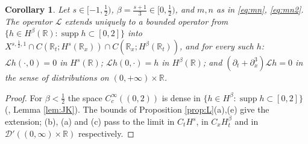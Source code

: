 \documentclass[10pt,reqno]{amsart}
\newtheorem{corollary}[theorem]{Corollary}
\theoremstyle{remark}
\numberwithin{equation}{section}
\newcommand{\R}{\mathbb R}
\newcommand{\pd}{\partial}
\newcommand{\supp}{\operatorname{supp}}
\newcommand{\Lc}{\mathcal{L}}
\begin{document}
\begin{corollary}\label{cor:Lext}
Let $s\in[-1,\frac12)$, $\beta=\frac{s+1}3\in[0,\frac12)$, and $m,n$ as in \eqref{eq:mn}, \eqref{eq:mn2}. The operator $\Lc$ extends uniquely to a bounded operator from $\{h\in H^\beta(\R):\supp h\subset[0,2]\}$ into $X^{s,\frac12,1}\cap C(\R_t;H^s(\R_x))\cap C(\R_x;H^\beta(\R_t))$, and for every such $h$: $\Lc h(\cdot,0)=0$ in $H^s(\R)$; $\Lc h(0,\cdot)=h$ in $H^\beta(\R)$; and $(\pd_t+\pd_x^3)\Lc h=0$ in the sense of distributions on $(0,+\infty)\times\R$.
\end{corollary}
\begin{proof}
For $\beta<\frac12$ the space $C^\infty_{c}((0,2))$ is dense in $\{h\in H^\beta:\supp h\subset[0,2]\}$ (\cite[Section 4]{Holmer}, Lemma \ref{lem:JK}). The bounds of Proposition \ref{prop:L}(a),(e) give the extension; (b), (a) and (c) pass to the limit in $C_tH^s$, in $C_xH^\beta_t$ and in $\mathcal D'((0,\infty)\times\R)$ respectively.
\end{proof}
\end{document}
